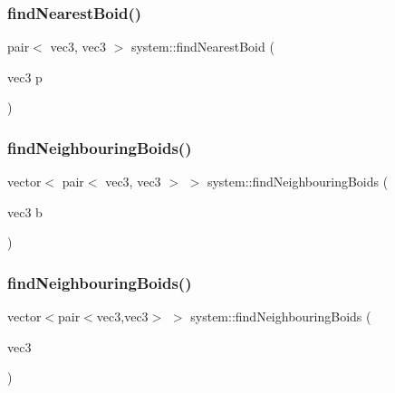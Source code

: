\mbox{\label{classsystem_a3b4275e6878a46041c8fbd16a75dbcd6}} 
\subsubsection{\texorpdfstring{find\+Nearest\+Boid()}{findNearestBoid()}}
{\footnotesize\ttfamily pair$<$ vec3, vec3 $>$ system\+::find\+Nearest\+Boid (\begin{DoxyParamCaption}\item[{vec3}]{p }\end{DoxyParamCaption})}

\mbox{\label{classsystem_abbaeb1ad1271eb4dccb006f3a33bdc0b}} 
\subsubsection{\texorpdfstring{find\+Neighbouring\+Boids()}{findNeighbouringBoids()}\hspace{0.1cm}{\footnotesize\ttfamily [1/2]}}
{\footnotesize\ttfamily vector$<$ pair$<$ vec3, vec3 $>$ $>$ system\+::find\+Neighbouring\+Boids (\begin{DoxyParamCaption}\item[{vec3}]{b }\end{DoxyParamCaption})}

\mbox{\label{classsystem_a2325f76474ccd70ecded65ec04816bb8}} 
\subsubsection{\texorpdfstring{find\+Neighbouring\+Boids()}{findNeighbouringBoids()}\hspace{0.1cm}{\footnotesize\ttfamily [2/2]}}
{\footnotesize\ttfamily vector$<$pair$<$vec3,vec3$>$ $>$ system\+::find\+Neighbouring\+Boids (\begin{DoxyParamCaption}\item[{vec3}]{ }\end{DoxyParamCaption})}

